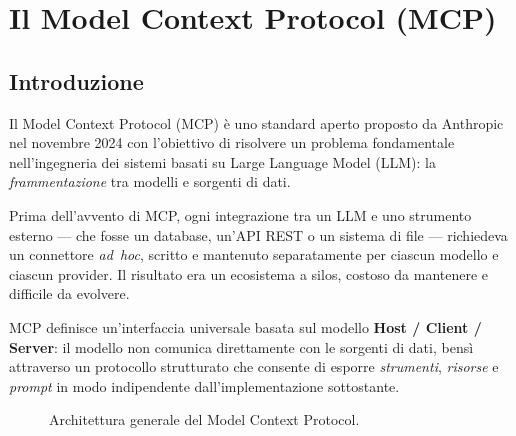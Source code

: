 
\chapter{Il Model Context Protocol (MCP)}
\label{chap:mcp}

\section{Introduzione}
\label{sec:mcp-intro}

Il Model Context Protocol (MCP) è uno standard aperto proposto da
Anthropic nel novembre 2024 con l'obiettivo di risolvere un problema
fondamentale nell'ingegneria dei sistemi basati su Large Language Model
(LLM): la \emph{frammentazione} tra modelli e sorgenti di dati.

Prima dell'avvento di MCP, ogni integrazione tra un LLM e uno
strumento esterno — che fosse un database, un'API REST o un sistema di
file — richiedeva un connettore \emph{ad~hoc}, scritto e mantenuto
separatamente per ciascun modello e ciascun provider. Il risultato era
un ecosistema a silos, costoso da mantenere e difficile da evolvere.

MCP definisce un'interfaccia universale basata sul modello
\textbf{Host / Client / Server}: il modello non comunica direttamente
con le sorgenti di dati, bensì attraverso un protocollo strutturato che
consente di esporre \emph{strumenti}, \emph{risorse} e \emph{prompt}
in modo indipendente dall'implementazione sottostante.

\begin{figure}[htbp]
    \centering
    \caption{Architettura generale del Model Context Protocol.}
    \label{fig:mcp-architecture}
\end{figure}


